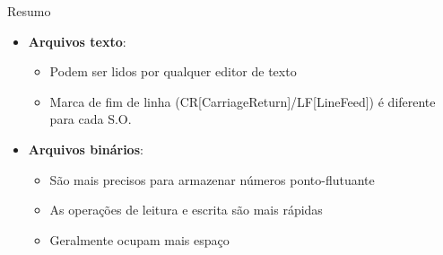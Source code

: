 \begin{frame}{Resumo}
    \begin{itemize}
        \item \textbf{Arquivos texto}:
        \begin{itemize}
            \item Podem ser lidos por qualquer editor de texto
            \item Marca de fim de linha (CR[CarriageReturn]/LF[LineFeed]) é diferente para cada S.O.
        \end{itemize}
        \item \textbf{Arquivos binários}:\begin{itemize}
            \item São mais precisos para armazenar números ponto-flutuante
            \item As operações de leitura e escrita são mais rápidas
            \item Geralmente ocupam mais espaço
        \end{itemize}
    \end{itemize}    
\end{frame}